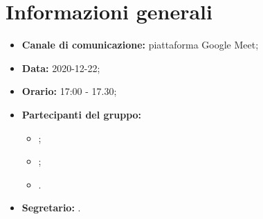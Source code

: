 \section{Informazioni generali}
\begin{itemize}
\item \textbf{Canale di comunicazione:} piattaforma Google Meet;
\item \textbf{Data:} 2020-12-22;
\item \textbf{Orario:} 17:00 - 17.30;
\item \textbf{Partecipanti del gruppo:}
	\begin{itemize}
	\item \MDI ;
	\item \MB ;
	\item \GB .
	\end{itemize}
\item \textbf{Segretario:} \MDI .

\end{itemize}